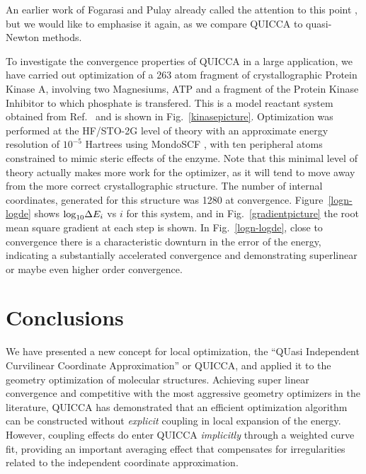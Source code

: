 \documentclass[prl,twocolumn,showpacs,twocolumngrid,superbib]{revtex4}
\begin{document}
An earlier work of Fogarasi and Pulay already called the attention 
to this point \cite{Pulay_natural_internals},
but we would like to emphasise it again, as we compare QUICCA to quasi-Newton
methods.


To investigate the convergence properties of QUICCA in a large application, we have carried out
optimization of a 263 atom fragment of crystallographic Protein Kinase A, involving two Magnesiums, 
ATP and a fragment of the Protein Kinase Inhibitor to which phosphate is transfered. This is a
model reactant system obtained from Ref.~ and is shown in 
Fig.~\ref{kinasepicture}.   Optimization was performed at the HF/STO-2G level of theory with an 
approximate energy resolution of $10^{-5}$ Hartrees using MondoSCF \cite{MondoSCF}, with ten peripheral atoms 
constrained to mimic steric effects of the enzyme.  Note that this minimal level of theory actually 
makes more work for the optimizer, as it will tend to move away from the more correct crystallographic 
structure. The number of internal coordinates, generated for this structure
was 1280 at convergence.
Figure~\ref{logn-logde} shows ${\rm log}_{10} \Delta E_i$ vs $i$ for this system, and in 
Fig.~\ref{gradientpicture} the root mean square gradient at each step is shown.   
In Fig.~\ref{logn-logde}, close to convergence there is a 
characteristic downturn in the error of the energy, indicating
a substantially accelerated convergence and demonstrating superlinear
or maybe even higher order convergence.


\section{Conclusions}

We have presented a new concept for local optimization, the ``QUasi Independent Curvilinear 
Coordinate Approximation'' or  QUICCA, and applied it to the geometry optimization of molecular 
structures. Achieving super linear convergence and competitive with the most aggressive geometry 
optimizers in the literature, QUICCA has demonstrated that an efficient optimization algorithm 
can be constructed without {\em explicit} coupling in local expansion of the energy.  
However, coupling effects do enter QUICCA {\em implicitly} through a weighted curve fit, 
providing an important averaging effect that compensates for irregularities related
to the independent coordinate approximation.  
\end{document}
